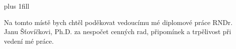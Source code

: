 \thispagestyle{empty}
\vglue 0pt plus 1fill

Na tomto místě bych chtěl poděkovat vedoucímu mé diplomové práce 
RNDr. Janu Šťovíčkovi, Ph.D. za nespočet cenných rad, připomínek a trpělivost
při vedení mé práce.

\vspace{20mm}
\newpage